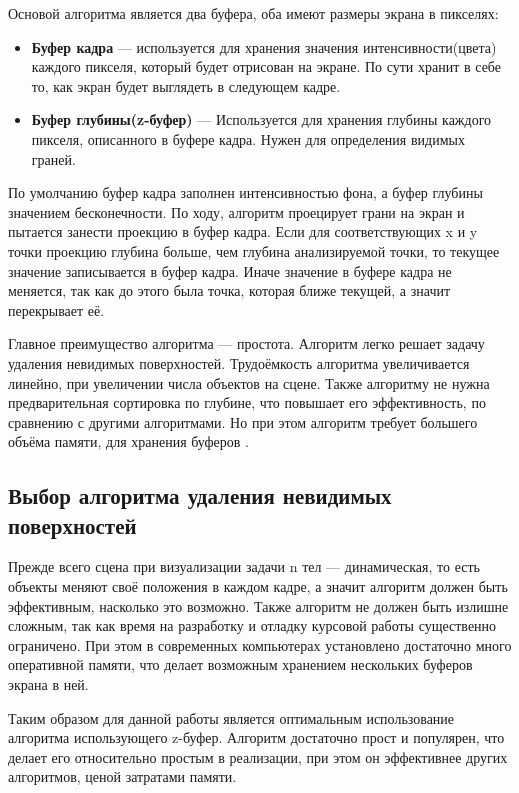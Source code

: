 Основой алгоритма является два буфера, оба имеют размеры экрана в пикселях:

\begin{itemize}
	\item \textbf{Буфер кадра} — используется для хранения значения интенсивности(цвета) каждого пикселя, который будет отрисован на экране. По сути хранит в себе то, как экран будет выглядеть в следующем кадре.
	\item \textbf{Буфер глубины(z-буфер)} — Используется для хранения глубины каждого пикселя, описанного в буфере кадра. Нужен для определения видимых граней.
\end{itemize}

По умолчанию буфер кадра заполнен интенсивностью фона, а буфер глубины значением бесконечности.
По ходу, алгоритм проецирует грани на экран и пытается занести проекцию в буфер кадра. Если для соответствующих x и y точки проекцию глубина больше, чем глубина анализируемой точки, то текущее значение записывается в буфер кадра. Иначе значение в буфере кадра не меняется, так как до этого была точка, которая ближе текущей, а значит перекрывает её.

Главное преимущество алгоритма — простота. Алгоритм легко решает задачу удаления невидимых поверхностей. Трудоёмкость алгоритма увеличивается линейно, при увеличении числа объектов на сцене. Также алгоритму не нужна предварительная сортировка по глубине, что повышает его эффективность, по сравнению с другими алгоритмами. Но при этом алгоритм требует большего объёма памяти, для хранения буферов \cite{rodgers}.

\subsection{Выбор алгоритма удаления невидимых поверхностей}

Прежде всего сцена при визуализации задачи n тел — динамическая, то есть объекты меняют своё положения в каждом кадре, а значит алгоритм должен быть эффективным, насколько это возможно. Также алгоритм не должен быть излишне сложным, так как время на разработку и отладку курсовой работы существенно ограничено. При этом в современных компьютерах установлено достаточно много оперативной памяти, что делает возможным хранением нескольких буферов экрана в ней.

Таким образом для данной работы является оптимальным использование алгоритма использующего z-буфер. Алгоритм достаточно прост и популярен, что делает его относительно простым в реализации, при этом он эффективнее других алгоритмов, ценой затратами памяти.


